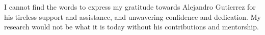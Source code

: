 \documentclass[edeposit,10pt,fullpage]{uiucthesis2009}
\begin{document}
I cannot find the words to express my gratitude towards Alejandro Gutierrez for his tireless support and assistance, and unwavering confidence and dedication. My research would not be what it is today without his contributions and mentorship. %



\tableofcontents
\listoftables
\listoffigures


%



\mainmatter











\appendix*



\backmatter


%

\end{document}

